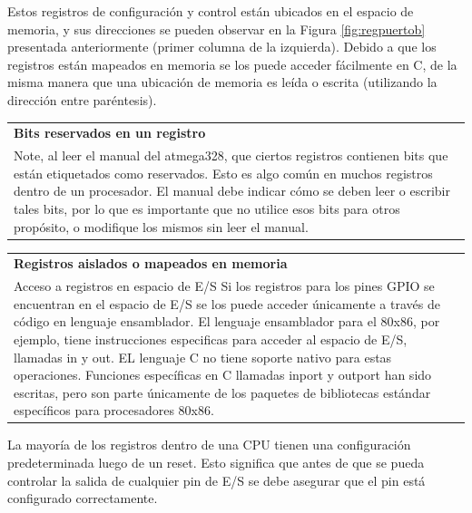 \documentclass[output=paper, 
colorlinks,
citecolor=brown,
newtxmath
]{langscibook}
\begin{document}
\begin{center}
\end{center}

Estos registros de configuración y control están ubicados en el espacio de memoria, y sus direcciones se pueden observar en la Figura \ref{fig:regpuertob} presentada anteriormente (primer columna de la izquierda).
Debido a que los registros están mapeados en memoria se los puede
acceder fácilmente en C, de la misma manera que una ubicación de memoria
es leída o escrita (utilizando la dirección entre paréntesis).


\begin{center}
\begin{tabularx}{\textwidth}{|X|}
\hline
\rowcolor{aliceblue}
\textbf{Bits reservados en un registro}\\
Note, al leer el manual del atmega328, que ciertos registros
contienen bits que están etiquetados como reservados.
Esto es algo común en muchos registros dentro de un procesador.
El manual debe indicar cómo se deben leer o escribir tales bits, por
lo que es importante que no utilice esos bits para otros propósito, 
o modifique los mismos sin leer el manual.\\
\hline
\end{tabularx}
\end{center}






\begin{center}
\begin{tabularx}{\textwidth}{|X|}
\hline
\rowcolor{aliceblue}
\textbf{Registros aislados o mapeados en memoria}\\
Acceso a registros en espacio de E/S
Si los registros para los pines GPIO se encuentran en el espacio de E/S
se los puede acceder únicamente a través de código en lenguaje ensamblador.
El lenguaje ensamblador para el 80x86, por ejemplo, tiene instrucciones 
especificas para
acceder al espacio de E/S, llamadas in y out. EL lenguaje C no tiene
soporte nativo para estas operaciones. Funciones específicas en C
llamadas inport y outport han sido escritas, pero son parte únicamente de los
paquetes de bibliotecas estándar específicos para procesadores 80x86.\\
\hline
\end{tabularx}
\end{center}




La mayoría de los registros dentro de una CPU tienen una configuración
predeterminada luego de un reset.
Esto significa que antes de que se pueda controlar la salida de cualquier
pin de E/S se debe asegurar que el pin está configurado correctamente.
\end{document}
